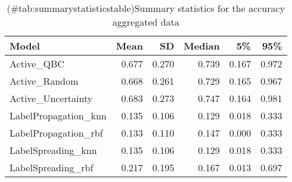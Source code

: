 \begin{table}[!h]

\caption{(\#tab:summarystatisticstable)Summary statistics for the accuracy aggregated data}
\centering
\begin{tabular}[t]{lrrrrr}
\toprule
Model & Mean & SD & Median & 5\% & 95\%\\
\midrule
Active\_QBC & 0.677 & 0.270 & 0.739 & 0.167 & 0.972\\
Active\_Random & 0.668 & 0.261 & 0.729 & 0.165 & 0.967\\
Active\_Uncertainty & 0.683 & 0.273 & 0.747 & 0.164 & 0.981\\
LabelPropagation\_knn & 0.135 & 0.106 & 0.129 & 0.018 & 0.333\\
LabelPropagation\_rbf & 0.133 & 0.110 & 0.147 & 0.000 & 0.333\\
LabelSpreading\_knn & 0.135 & 0.106 & 0.129 & 0.018 & 0.333\\
LabelSpreading\_rbf & 0.217 & 0.195 & 0.167 & 0.013 & 0.697\\
\bottomrule
\end{tabular}
\end{table}
